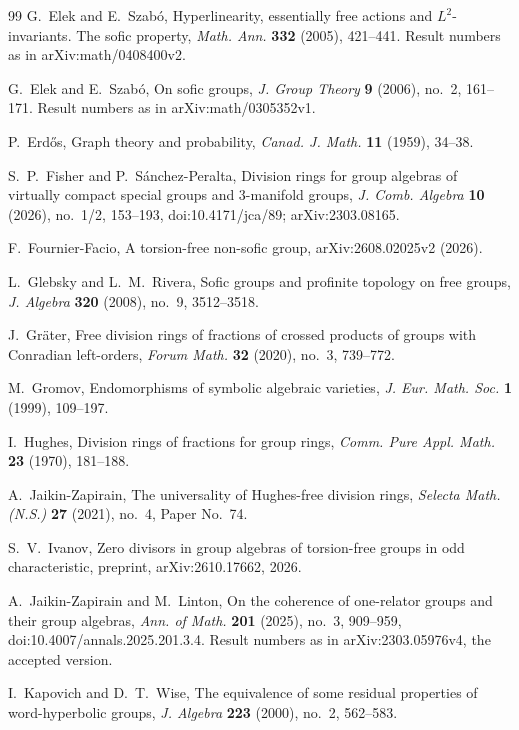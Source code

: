 \documentclass[11pt]{article}
\theoremstyle{definition}
\theoremstyle{remark}
\numberwithin{equation}{section}
\begin{document}
\begin{thebibliography}{99}
G.~Elek and E.~Szab\'o,
Hyperlinearity, essentially free actions and $L^2$-invariants. The sofic property,
\emph{Math. Ann.} \textbf{332} (2005), 421--441. Result numbers as in arXiv:math/0408400v2.

G.~Elek and E.~Szab\'o,
On sofic groups,
\emph{J. Group Theory} \textbf{9} (2006), no.~2, 161--171. Result numbers as in arXiv:math/0305352v1.

P.~Erd\H{o}s,
Graph theory and probability,
\emph{Canad. J. Math.} \textbf{11} (1959), 34--38.

S.~P.~Fisher and P.~S\'anchez-Peralta,
Division rings for group algebras of virtually compact special groups and $3$-manifold groups,
\emph{J. Comb. Algebra} \textbf{10} (2026), no.~1/2, 153--193, doi:10.4171/jca/89; arXiv:2303.08165.

F.~Fournier-Facio,
A torsion-free non-sofic group,
arXiv:2608.02025v2 (2026).

L.~Glebsky and L.~M.~Rivera,
Sofic groups and profinite topology on free groups,
\emph{J. Algebra} \textbf{320} (2008), no.~9, 3512--3518.

J.~Gr\"ater,
Free division rings of fractions of crossed products of groups with Conradian left-orders,
\emph{Forum Math.} \textbf{32} (2020), no.~3, 739--772.

M.~Gromov,
Endomorphisms of symbolic algebraic varieties,
\emph{J. Eur. Math. Soc.} \textbf{1} (1999), 109--197.

I.~Hughes,
Division rings of fractions for group rings,
\emph{Comm. Pure Appl. Math.} \textbf{23} (1970), 181--188.

A.~Jaikin-Zapirain,
The universality of Hughes-free division rings,
\emph{Selecta Math. (N.S.)} \textbf{27} (2021), no.~4, Paper No.~74.

S.~V.~Ivanov,
Zero divisors in group algebras of torsion-free groups in odd characteristic,
preprint, arXiv:2610.17662, 2026.

A.~Jaikin-Zapirain and M.~Linton,
On the coherence of one-relator groups and their group algebras,
\emph{Ann. of Math.} \textbf{201} (2025), no.~3, 909--959, doi:10.4007/annals.2025.201.3.4. Result numbers as in arXiv:2303.05976v4, the accepted version.

I.~Kapovich and D.~T.~Wise,
The equivalence of some residual properties of word-hyperbolic groups,
\emph{J. Algebra} \textbf{223} (2000), no.~2, 562--583.


\end{thebibliography}
\end{document}

